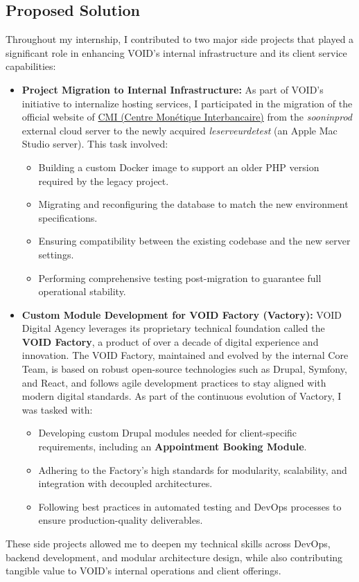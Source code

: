 \subsection{Proposed Solution}
\noindent
Throughout my internship, I contributed to two major side projects that played a significant role in enhancing VOID's internal infrastructure and its client service capabilities:

\begin{itemize}
\item \textbf{Project Migration to Internal Infrastructure:}  
As part of VOID's initiative to internalize hosting services, I participated in the migration of the official website of \href{https://www.cmi.co.ma/}{CMI (Centre Monétique Interbancaire)} from the \textit{sooninprod} external cloud server to the newly acquired \textit{leserveurdetest} (an Apple Mac Studio server).  
This task involved:
\begin{itemize}
\item Building a custom Docker image to support an older PHP version required by the legacy project.
\item Migrating and reconfiguring the database to match the new environment specifications.
\item Ensuring compatibility between the existing codebase and the new server settings.
\item Performing comprehensive testing post-migration to guarantee full operational stability.
\end{itemize}

\item \textbf{Custom Module Development for VOID Factory (Vactory):}  
VOID Digital Agency leverages its proprietary technical foundation called the \textbf{VOID Factory}, a product of over a decade of digital experience and innovation.  
The VOID Factory, maintained and evolved by the internal Core Team, is based on robust open-source technologies such as Drupal, Symfony, and React, and follows agile development practices to stay aligned with modern digital standards.  
As part of the continuous evolution of Vactory, I was tasked with:
\begin{itemize}
\item Developing custom Drupal modules needed for client-specific requirements, including an \textbf{Appointment Booking Module}.
\item Adhering to the Factory's high standards for modularity, scalability, and integration with decoupled architectures.
\item Following best practices in automated testing and DevOps processes to ensure production-quality deliverables.
\end{itemize}
\end{itemize}

\medskip

\noindent
These side projects allowed me to deepen my technical skills across DevOps, backend development, and modular architecture design, while also contributing tangible value to VOID's internal operations and client offerings.

